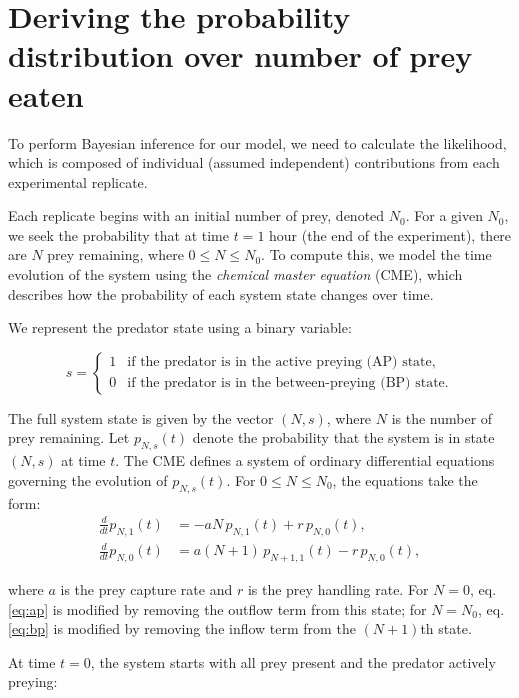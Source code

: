 \section{Deriving the probability distribution over number of prey eaten }

To perform Bayesian inference for our model, we need to calculate the likelihood, which is composed of individual (assumed independent) contributions from each experimental replicate.

Each replicate begins with an initial number of prey, denoted $N_0$. For a given $N_0$, we seek the probability that at time $t=1 \text{ hour}$ (the end of the experiment), there are $N$ prey remaining, where $0 \leq N \leq N_0$. To compute this, we model the time evolution of the system using the \emph{chemical master equation} (CME), which describes how the probability of each system state changes over time.

We represent the predator state using a binary variable:

\begin{equation}
s =
\begin{cases}
1 & \text{if the predator is in the active preying (AP) state}, \\
0 & \text{if the predator is in the between-preying (BP) state}.
\end{cases}
\end{equation}

The full system state is given by the vector $(N, s)$, where $N$ is the number of prey remaining. Let $p_{N,s}(t)$ denote the probability that the system is in state $(N,s)$ at time $t$. The CME defines a system of ordinary differential equations governing the evolution of $p_{N,s}(t)$. For $0 \leq N \leq N_0$, the equations take the form:
\begin{align}
\label{eq:ap}
\frac{d}{dt} p_{N,1}(t) &= -a N \, p_{N,1}(t) + r \, p_{N,0}(t), \\
\label{eq:bp}
\frac{d}{dt} p_{N,0}(t) &= a (N+1)\, p_{N+1,1}(t) - r \, p_{N,0}(t),
\end{align}

where $a$ is the prey capture rate and $r$ is the prey handling rate. For $N=0$, eq. \eqref{eq:ap} is modified by removing the outflow term from this state; for $N = N_0$, eq. \eqref{eq:bp} is modified by removing the inflow term from the $(N+1)$th state.

At time $t = 0$, the system starts with all prey present and the predator actively preying:

